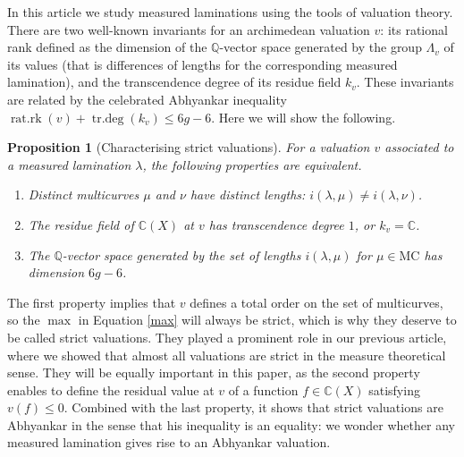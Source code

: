 \documentclass{amsart}
\newtheorem{propintro}{Proposition}
\newcommand{\C}{\mathbb{C}}
\newcommand{\Q}{\mathbb{Q}}
\newcommand{\MC}{\mathrm{MC}}
\DeclareMathOperator{\ratrk}{\mathrm{rat.rk}}
\DeclareMathOperator{\degtr}{\mathrm{tr.deg}}
\begin{document}

In this article we study measured laminations using the tools of valuation theory. There are two well-known invariants for an archimedean valuation $v$: its rational rank defined as the dimension of the $\Q$-vector space generated by the group $\Lambda_v$ of its values (that is differences of lengths for the corresponding measured lamination), and the transcendence degree of its residue field $k_v$.
%
These invariants are related by the celebrated Abhyankar inequality $\ratrk(v)+\degtr(k_v)\le 6g-6$. Here we will show the following.
\begin{propintro}[Characterising strict valuations]
For a valuation $v$ associated to a measured lamination $\lambda$, the following properties are equivalent.
\begin{enumerate}
    \item Distinct multicurves $\mu$ and $\nu$ have distinct lengths: $i(\lambda,\mu)\ne i(\lambda,\nu)$.
    \item The residue field of $\C(X)$ at $v$ has transcendence degree $1$, or $k_v=\C$.
    \item The $\Q$-vector space generated by the set of lengths $i(\lambda,\mu)$ for $\mu\in \MC$ has dimension $6g-6$.
\end{enumerate}
\end{propintro}
The first property implies that $v$ defines a total order on the set of multicurves, so the $\max$ in Equation \ref{max} will always be strict, which is why they deserve to be called strict valuations.
%
They played a prominent role in our previous article, where we showed that almost all valuations are strict in the measure theoretical sense.
%
They will be equally important in this paper, as the second property enables to define the residual value at $v$ of a function $f\in \C(X)$ satisfying $v(f)\le 0$. 
%
Combined with the last property, it shows that strict valuations are Abhyankar in the sense that his inequality is an equality: we wonder whether any measured lamination gives rise to an Abhyankar valuation.
\end{document}
